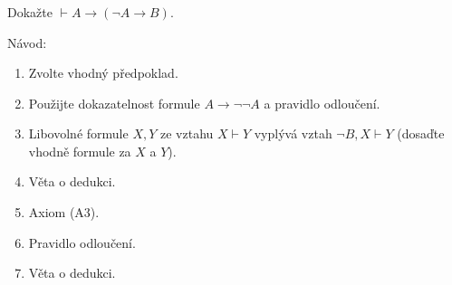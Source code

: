 \subsubsection{}
Dokažte $\vdash A \rightarrow (\neg A \rightarrow B)$.

Návod:
\begin{enumerate}[1)]
	\item Zvolte vhodný předpoklad.
	\item Použijte dokazatelnost formule $A \rightarrow \neg\neg A$ a pravidlo odloučení.
	\item Libovolné formule $X,Y$ ze vztahu $X \vdash Y$ vyplývá vztah $\neg B, X \vdash Y$ (dosaďte vhodně formule za $X$ a $Y$).
	\item Věta o dedukci.
	\item Axiom (A3).
	\item Pravidlo odloučení.
	\item Věta o dedukci.
\end{enumerate}
